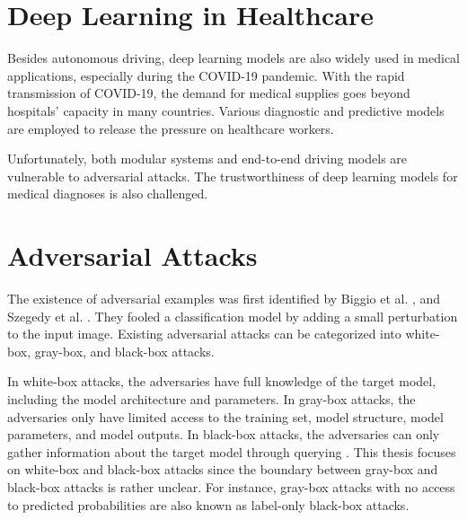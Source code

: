 \section{Deep Learning in Healthcare}
\label{sec:healthcare}

Besides autonomous driving, deep learning models are also widely used in medical applications, especially during the COVID-19 pandemic. With the rapid transmission of COVID-19, the demand for medical supplies goes beyond hospitals' capacity in many countries. Various diagnostic and predictive models are employed to release the pressure on healthcare workers.

Unfortunately, both modular systems and end-to-end driving models are vulnerable to adversarial attacks. The trustworthiness of deep learning models for medical diagnoses is also challenged.

\clearpage

\section{Adversarial Attacks}
\label{sec:adv_attack}

The existence of adversarial examples was first identified by Biggio et al. \citep{biggio2013evasion}, and Szegedy et al. \citep{szegedy2013intriguing}. They fooled a classification model by adding a small perturbation to the input image. Existing adversarial attacks can be categorized into white-box, gray-box, and black-box attacks. 

In white-box attacks, the adversaries have full knowledge of the target model, including the model architecture and parameters. In gray-box attacks, the adversaries only have limited access to the training set, model structure, model parameters, and model outputs. In black-box attacks, the adversaries can only gather information about the target model through querying \citep{REN2020346}. This thesis focuses on white-box and black-box attacks since the boundary between gray-box and black-box attacks is rather unclear. For instance, gray-box attacks with no access to predicted probabilities are also known as label-only black-box attacks.


